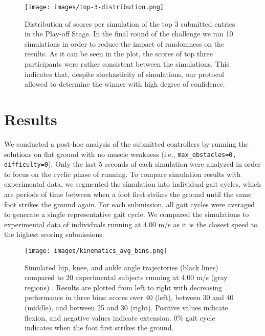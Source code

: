 \documentclass[graybox]{svmult}
\begin{document}

\begin{figure}[ht!]
\centering
\texttt{[image: images/top-3-distribution.png]}
\caption{Distribution of scores per simulation of the top 3 submitted entries in the Play-off Stage. In the final round of the challenge we ran 10 simulations in order to reduce the impact of randomness on the results. As it can be seen in the plot, the scores of top three participants were rather consistent between the simulations. This indicates that, despite stochasticity of simulations, our protocol allowed to determine the winner with high degree of confidence.}
\label{fig:top_3_distribution}
\end{figure}

\section{Results}\label{s:results}
We conducted a post-hoc analysis of the submitted controllers by running the solutions on flat ground with no muscle weakness (i.e., \verb|max_obstacles=0, difficulty=0|). Only the last 5 seconds of each simulation were analyzed in order to focus on the cyclic phase of running. To compare simulation results with experimental data, we segmented the simulation into individual gait cycles, which are periods of time between when a foot first strikes the ground until the same foot strikes the ground again. For each submission, all gait cycles were averaged to generate a single representative gait cycle. We compared the simulations to experimental data of individuals running at 4.00 m/s \cite{hamner2013running} as it is the closest speed to the highest scoring submissions. 

\begin{figure}[ht!]
  \centering
  \texttt{[image: images/kinematics\_avg\_bins.png]}
  \caption{Simulated hip, knee, and ankle angle trajectories (black lines) compared to 20 experimental subjects running at 4.00 m/s (gray regions) \cite{hamner2013running}. Results are plotted from left to right with decreasing performance in three bins: scores over 40 (left), between 30 and 40 (middle), and between 25 and 30 (right). Positive values indicate flexion, and negative values indicate extension. 0\% gait cycle indicates when the foot first strikes the ground.}
  \label{fig:analysis}
\end{figure}
\end{document}
